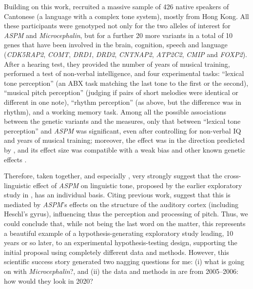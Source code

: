 \documentclass[twoside,twocolumn]{article}
\begin{document}
Building on this work, \citet{wong_sciadv_2020} recruited a massive sample of 426 native speakers of Cantonese (a language with a complex tone system), mostly from Hong Kong.
All these participants were genotyped not only for the two alleles of interest for \textit{ASPM} and \textit{Microcephalin}, but for a further 20 more variants in a total of 10 genes that have been involved in the brain, cognition, speech and language (\textit{CDK5RAP2}, \textit{COMT}, \textit{DRD1}, \textit{DRD2}, \textit{CNTNAP2}, \textit{ATP2C2}, \textit{CMIP} and \textit{FOXP2}).
After a hearing test, they provided the number of years of musical training, performed a test of non-verbal intelligence, and four experimental tasks: ``lexical tone perception'' (an ABX task matching the last tone to the first or the second), ``musical pitch perception'' (judging if pairs of short melodies were identical or different in one note), ``rhythm perception'' (as above, but the difference was in rhythm), and a working memory task.
Among all the possible associations between the genetic variants and the measures, only that between ``lexical tone perception'' and \textit{ASPM} was significant, even after controlling for non-verbal IQ and years of musical training; moreover, the effect was in the direction predicted by \citet{dediu_language_2017}, and its effect size was compatible with a weak bias and other known genetic effects \citep{wong_sciadv_2020}.

Therefore, taken together, \citet{wong_plosone_2012} and especially \citet{wong_sciadv_2020}, very strongly suggest that the cross-linguistic effect of \textit{ASPM} on linguistic tone, proposed by the earlier exploratory study in \citet{dediu_language_2017}, has an individual basis.
Citing previous work, \citet{wong_sciadv_2020} suggest that this is mediated by \textit{ASPM}'s effects on the structure of the auditory cortex (including Heschl’s gyrus), influencing thus the perception and processing of pitch.
Thus, we could conclude that, while not being the last word on the matter, this represents a beautiful example of a hypothesis-generating exploratory study leading, 10 years or so later, to an experimental hypothesis-testing design, supporting the initial proposal using completely different data and methods.
However, this scientific success story generated two nagging questions for me: (i) what is going on with \textit{Microcephalin}?, and (ii) the data and methods in \citet{dediu_language_2017} are from 2005--2006: how would they look in 2020?
\end{document}

